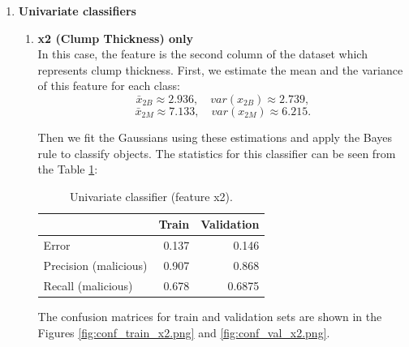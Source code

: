 \documentclass[11pt,a4paper]{article}
\begin{document}
 \begin{enumerate}
	 \item \textbf{Univariate classifiers}
	\begin{enumerate}
		\item \textbf {x2 (Clump Thickness) only} \\
		In this case, the feature is the second column of the dataset which represents clump thickness.
		First, we estimate the mean and the variance of this feature for each class:
		$$\bar{x}_{2B} \approx 2.936, \quad var(x_{2B}) \approx 2.739, $$
		$$\bar{x}_{2M} \approx 7.133, \quad var(x_{2M}) \approx 6.215.$$
		
		Then we fit the Gaussians using these estimations and apply the Bayes rule to classify objects.
		The statistics for this classifier can be seen from the Table \ref{tab:results-x2}:
		
		\begin{table}[H]
			\centering
				\begin{tabular}{lrr}
					\toprule
					 & \textbf{Train} & \textbf{Validation}  \\ \midrule
					Error & 0.137 & 0.146 \\	
					Precision (malicious) & 0.907 &0.868 \\
					Recall (malicious) & 0.678 & 0.6875 \\
					\bottomrule
				\end{tabular}
			\caption{Univariate classifier (feature x2).}
			\label{tab:results-x2}
		\end{table}
		
		The confusion matrices for train and validation sets are shown in the Figures \ref{fig:conf_train_x2.png} and \ref{fig:conf_val_x2.png}.
		

\end{enumerate}
\end{enumerate}
\end{document}
